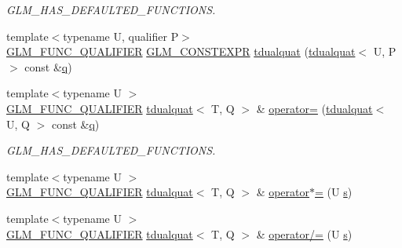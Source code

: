 \begin{DoxyCompactItemize}
\begin{DoxyCompactList}\small\item\em G\+L\+M\+\_\+\+H\+A\+S\+\_\+\+D\+E\+F\+A\+U\+L\+T\+E\+D\+\_\+\+F\+U\+N\+C\+T\+I\+O\+NS. \end{DoxyCompactList}\item 
{\footnotesize template$<$typename U, qualifier P$>$ }\\\mbox{\hyperlink{setup_8hpp_a33fdea6f91c5f834105f7415e2a64407}{G\+L\+M\+\_\+\+F\+U\+N\+C\+\_\+\+Q\+U\+A\+L\+I\+F\+I\+ER}} \mbox{\hyperlink{setup_8hpp_a08b807947b47031d3a511f03f89645ad}{G\+L\+M\+\_\+\+C\+O\+N\+S\+T\+E\+X\+PR}} \mbox{\hyperlink{structglm_1_1tdualquat_a00f0899c1213aa991a65dfaf8d15fba5}{tdualquat}} (\mbox{\hyperlink{structglm_1_1tdualquat}{tdualquat}}$<$ U, P $>$ const \&\mbox{\hyperlink{_s_d_l__opengl_8h_a8fc1e7b9baaae687804c7eed46ca09c6}{q}})
\item 
{\footnotesize template$<$typename U $>$ }\\\mbox{\hyperlink{setup_8hpp_a33fdea6f91c5f834105f7415e2a64407}{G\+L\+M\+\_\+\+F\+U\+N\+C\+\_\+\+Q\+U\+A\+L\+I\+F\+I\+ER}} \mbox{\hyperlink{structglm_1_1tdualquat}{tdualquat}}$<$ T, Q $>$ \& \mbox{\hyperlink{structglm_1_1tdualquat_a6bdd31159c6bf9d7bca75971c2a1e512}{operator=}} (\mbox{\hyperlink{structglm_1_1tdualquat}{tdualquat}}$<$ U, Q $>$ const \&\mbox{\hyperlink{_s_d_l__opengl_8h_a8fc1e7b9baaae687804c7eed46ca09c6}{q}})
\begin{DoxyCompactList}\small\item\em G\+L\+M\+\_\+\+H\+A\+S\+\_\+\+D\+E\+F\+A\+U\+L\+T\+E\+D\+\_\+\+F\+U\+N\+C\+T\+I\+O\+NS. \end{DoxyCompactList}\item 
{\footnotesize template$<$typename U $>$ }\\\mbox{\hyperlink{setup_8hpp_a33fdea6f91c5f834105f7415e2a64407}{G\+L\+M\+\_\+\+F\+U\+N\+C\+\_\+\+Q\+U\+A\+L\+I\+F\+I\+ER}} \mbox{\hyperlink{structglm_1_1tdualquat}{tdualquat}}$<$ T, Q $>$ \& \mbox{\hyperlink{structglm_1_1tdualquat_ab300e10bf89a90d694526c75ed423546}{operator$\ast$=}} (U \mbox{\hyperlink{_s_d_l__opengl_8h_a4af680a6c683f88ed67b76f207f2e6e4}{s}})
\item 
{\footnotesize template$<$typename U $>$ }\\\mbox{\hyperlink{setup_8hpp_a33fdea6f91c5f834105f7415e2a64407}{G\+L\+M\+\_\+\+F\+U\+N\+C\+\_\+\+Q\+U\+A\+L\+I\+F\+I\+ER}} \mbox{\hyperlink{structglm_1_1tdualquat}{tdualquat}}$<$ T, Q $>$ \& \mbox{\hyperlink{structglm_1_1tdualquat_a57b7a39ce0aee940340ac0f20e65963c}{operator/=}} (U \mbox{\hyperlink{_s_d_l__opengl_8h_a4af680a6c683f88ed67b76f207f2e6e4}{s}})
\end{DoxyCompactItemize}
